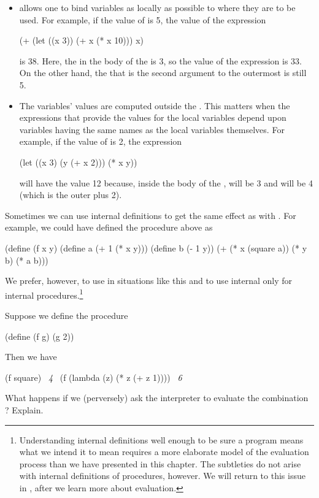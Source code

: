 \begin{itemize}
\item
{} allows one to bind variables as locally as possible to where they
are to be used.  For example, if the value of  is 5, the value of the
expression
\begin{codeBlock}
(+ (let ((x 3))
     (+ x (* x 10)))
   x)
\end{codeBlock}

\noindent
is 38.  Here, the  in the body of the  is 3, so the value of
the  expression is 33.  On the other hand, the  that is the
second argument to the outermost \code{+} is still 5.

\item
The variables' values are computed outside the .  This matters when
the expressions that provide the values for the local variables depend upon
variables having the same names as the local variables themselves.  For
example, if the value of  is 2, the expression
\begin{codeBlock}
(let ((x 3)
      (y (+ x 2)))
  (* x y))
\end{codeBlock}

\noindent
will have the value 12 because, inside the body of the , 
will be 3 and  will be 4 (which is the outer  plus 2).
\end{itemize}

\noindent
Sometimes we can use internal definitions to get the same effect as with
.  For example, we could have defined the procedure  above as

\begin{codeBlock}
(define (f x y)
  (define a (+ 1 (* x y)))
  (define b (- 1 y))
  (+ (* x (square a))
     (* y b)
     (* a b)))
\end{codeBlock}

\noindent
We prefer, however, to use  in situations like this and to use
internal  only for internal procedures.\footnote{Understanding
internal definitions well enough to be sure a program means what we intend it
to mean requires a more elaborate model of the evaluation process than we have
presented in this chapter.  The subtleties do not arise with internal
definitions of procedures, however.  We will return to this issue in
, after we learn more about evaluation.}

\begin{exerciseGroup}
\label{Exercise 1.34}
 Suppose we define the procedure

\begin{codeBlock}
(define (f g) (g 2))
\end{codeBlock}

Then we have

\begin{codeBlock}
(f square)
~\textit{4}~
(f (lambda (z) (* z (+ z 1))))
~\textit{6}~
\end{codeBlock}

What happens if we (perversely) ask the interpreter to evaluate the combination
?  Explain.
\end{exerciseGroup}

